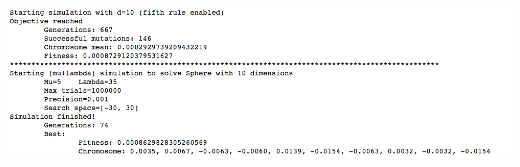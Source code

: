 \documentclass[10pt,letterpaper]{article}
\begin{document}
\begin{enumerate}
\begin{enumerate}
                \begin{center}
                    \includegraphics[scale=.5]{./assets/ex3-b.png}
                \end{center}
        \end{enumerate}
\end{enumerate}
\end{document}
